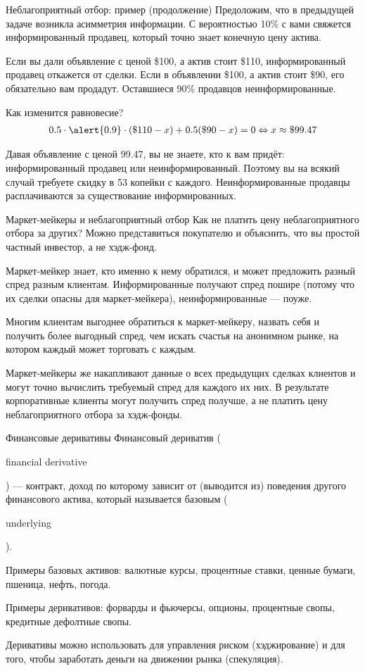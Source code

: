 \documentclass{beamer}
\newcommand{\en}[1]{\begin{otherlanguage}{english}#1\end{otherlanguage}}
\begin{document}
\begin{frame}{Неблагоприятный отбор: пример (продолжение)}
\justify
Предоложим, что в предыдущей задаче возникла асимметрия информации. С 
вероятностью 10\% с вами свяжется информированный продавец, который точно знает
конечную цену актива.

\justify
Если вы дали объявление с ценой \$100, а актив стоит \$110, информированный 
продавец откажется от сделки. Если в объявлении \$100, а актив стоит \$90, его
обязательно вам продадут. Оставшиеся 90\% продавцов неинформированные.

\justify
Как изменится равновесие?
\begin{align*}
0.5\cdot\alert{0.9}\cdot(\$110 - x) + 0.5(\$90 - x) = 0 \Leftrightarrow x \approx \$99.47
\end{align*}

\justify
Давая объявление с ценой 99.47, вы не знаете, кто к вам придёт: информированный 
продавец или неинформированный. Поэтому вы на всякий случай требуете скидку в 53 
копейки с каждого. Неинформированные продавцы расплачиваются за существование информированных.
\end{frame}



\begin{frame}{Маркет-мейкеры и неблагоприятный отбор}
\justify
Как не платить цену неблагоприятного отбора за других? Можно 
представиться покупателю и объяснить, что вы простой частный инвестор, а не хэдж-фонд.

\justify
Маркет-мейкер знает, кто именно к нему обратился, и может предложить разный спред разным клиентам. Информированные получают спред пошире (потому что их сделки опасны для маркет-мейкера), неинформированные --- поуже.

\justify
Многим клиентам выгоднее обратиться к маркет-мейкеру, назвать себя и 
получить более выгодный спред, чем искать счастья на анонимном рынке, на котором
каждый может торговать с каждым.

\justify
Маркет-мейкеры же накапливают данные о всех предыдущих сделках клиентов и
могут точно вычислить требуемый спред для каждого их них. В результате корпоративные клиенты могут получить спред получше, а не платить цену неблагоприятного отбора за хэдж-фонды.
\end{frame}



\begin{frame}{Финансовые деривативы}
\justify
\alert{Финансовый дериватив} (\en{financial derivative}) --- контракт, доход по которому зависит 
от (выводится из) поведения другого финансового актива, который называется базовым 
(\en{underlying}).

\justify
Примеры базовых активов: валютные курсы, процентные ставки, ценные бумаги, пшеница, нефть, погода.

\justify
Примеры деривативов: форварды и фьючерсы, опционы, процентные свопы, кредитные дефолтные свопы.

\justify
Деривативы можно использовать для управления риском (хэджирование) и для того, чтобы заработать деньги на движении рынка (спекуляция). 
\end{frame}
\end{document}
